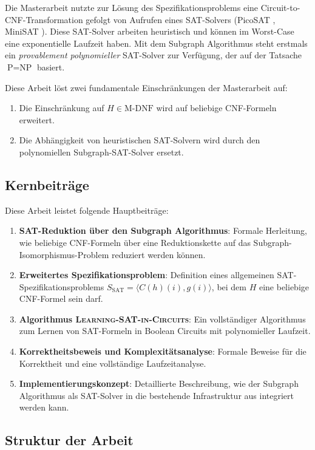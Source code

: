 ﻿\documentclass[a4paper,12pt]{article}
\theoremstyle{definition}
\begin{document}
Die Masterarbeit nutzte zur Lösung des Spezifikationsproblems eine Circuit-to-CNF-Transformation gefolgt von Aufrufen eines SAT-Solvers (PicoSAT \cite{Bie08}, MiniSAT \cite{ES04}). Diese SAT-Solver arbeiten heuristisch und können im Worst-Case eine exponentielle Laufzeit haben. Mit dem Subgraph Algorithmus \cite{Epp26} steht erstmals ein \textit{provablement polynomieller} SAT-Solver zur Verfügung, der auf der Tatsache $\text{P} = \text{NP}$ basiert.

Diese Arbeit löst zwei fundamentale Einschränkungen der Masterarbeit auf:
\begin{enumerate}
    \item Die Einschränkung auf $H \in \text{M-DNF}$ wird auf beliebige CNF-Formeln erweitert.
    \item Die Abhängigkeit von heuristischen SAT-Solvern wird durch den polynomiellen Subgraph-SAT-Solver ersetzt.
\end{enumerate}

\subsection{Kernbeiträge}

Diese Arbeit leistet folgende Hauptbeiträge:
\begin{enumerate}
    \item \textbf{SAT-Reduktion über den Subgraph Algorithmus}: Formale Herleitung, wie beliebige CNF-Formeln über eine Reduktionskette auf das Subgraph-Isomorphismus-Problem reduziert werden können.
    \item \textbf{Erweitertes Spezifikationsproblem}: Definition eines allgemeinen SAT-Spezifi\-kationsproblems $S_{\text{SAT}} = \langle C(h)(i), g(i) \rangle$, bei dem $H$ eine beliebige CNF-Formel sein darf.
    \item \textbf{Algorithmus \textsc{Learning-SAT-in-Circuits}}: Ein vollständiger Algorithmus zum Lernen von SAT-Formeln in Boolean Circuits mit polynomieller Laufzeit.
    \item \textbf{Korrektheitsbeweis und Komplexitätsanalyse}: Formale Beweise für die Korrektheit und eine vollständige Laufzeitanalyse.
    \item \textbf{Implementierungskonzept}: Detaillierte Beschreibung, wie der Subgraph Algorithmus als SAT-Solver in die bestehende Infrastruktur aus \cite{Epp13} integriert werden kann.
\end{enumerate}

\subsection{Struktur der Arbeit}
\end{document}
